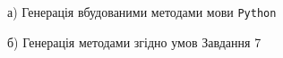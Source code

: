 \documentclass[a4paper,14pt]{extarticle} %
\numberwithin{equation}{section}
\begin{document}
\begin{figure}[H]
    \begin{minipage}[H]{0.49\linewidth}
        а) Генерація вбудованими методами мови \texttt{Python}
    \end{minipage}
    \hfill
    \begin{minipage}[H]{0.49\linewidth}
        б) Генерація методами згідно умов Завдання 7
    \end{minipage}
\end{figure}
\end{document}
